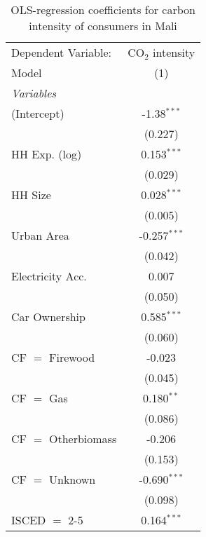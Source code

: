 
\begin{table}[htbp!]
   \centering
   \small
   \begin{adjustbox}{width = 1\textwidth, max height = 0.95\textheight, center}
      \begin{threeparttable}[b]
         \caption{\label{tab:OLS_1_MLI} OLS-regression coefficients for carbon intensity of consumers in Mali}
         \begin{tabular}{lc}
            \tabularnewline \midrule \midrule
            Dependent Variable: & CO$_{2}$ intensity\\  
            Model               & (1)\\  
            \midrule
            \emph{Variables}\\
            (Intercept)         & -1.38$^{***}$\\   
                                & (0.227)\\   
            HH Exp. (log)       & 0.153$^{***}$\\   
                                & (0.029)\\   
            HH Size             & 0.028$^{***}$\\   
                                & (0.005)\\   
            Urban Area          & -0.257$^{***}$\\   
                                & (0.042)\\   
            Electricity Acc.    & 0.007\\   
                                & (0.050)\\   
            Car Ownership       & 0.585$^{***}$\\   
                                & (0.060)\\   
            CF $=$ Firewood     & -0.023\\   
                                & (0.045)\\   
            CF $=$ Gas          & 0.180$^{**}$\\   
                                & (0.086)\\   
            CF $=$ Otherbiomass & -0.206\\   
                                & (0.153)\\   
            CF $=$ Unknown      & -0.690$^{***}$\\   
                                & (0.098)\\   
            ISCED $=$ 2-5       & 0.164$^{***}$\\   

\end{tabular}
\end{threeparttable}
\end{adjustbox}
\end{table}
